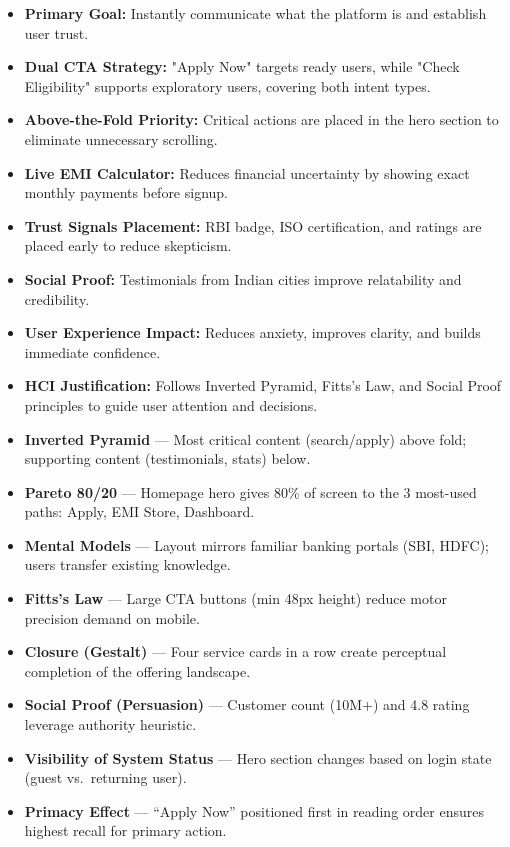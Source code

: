 \documentclass[11pt,a4paper]{article}
\newcommand{\ptag}[1]{\colorbox{tagbg}{\textcolor{tagtxt}{\textbf{\small #1}}}}
\begin{document}
\begin{itemize}[leftmargin=1.5em,itemsep=4pt]

\item \textbf{Primary Goal:}
Instantly communicate what the platform is and establish user trust.

\item \textbf{Dual CTA Strategy:}
"Apply Now" targets ready users, while "Check Eligibility" supports exploratory users, covering both intent types.

\item \textbf{Above-the-Fold Priority:}
Critical actions are placed in the hero section to eliminate unnecessary scrolling.

\item \textbf{Live EMI Calculator:}
Reduces financial uncertainty by showing exact monthly payments before signup.

\item \textbf{Trust Signals Placement:}
RBI badge, ISO certification, and ratings are placed early to reduce skepticism.

\item \textbf{Social Proof:}
Testimonials from Indian cities improve relatability and credibility.

\item \textbf{User Experience Impact:}
Reduces anxiety, improves clarity, and builds immediate confidence.

\item \textbf{HCI Justification:}
Follows Inverted Pyramid, Fitts’s Law, and Social Proof principles to guide user attention and decisions.

\end{itemize}
\begin{hcimap}
\begin{itemize}[leftmargin=1.2em,itemsep=2pt]
  \item \ptag{Inverted Pyramid} --- Most critical content (search/apply) above fold; supporting content (testimonials, stats) below.
  \item \ptag{Pareto 80/20} --- Homepage hero gives 80\% of screen to the 3 most-used paths: Apply, EMI Store, Dashboard.
  \item \ptag{Mental Models} --- Layout mirrors familiar banking portals (SBI, HDFC); users transfer existing knowledge.
  \item \ptag{Fitts's Law} --- Large CTA buttons (min 48px height) reduce motor precision demand on mobile.
  \item \ptag{Closure (Gestalt)} --- Four service cards in a row create perceptual completion of the offering landscape.
  \item \ptag{Social Proof (Persuasion)} --- Customer count (10M+) and 4.8 rating leverage authority heuristic.
  \item \ptag{Visibility of System Status} --- Hero section changes based on login state (guest vs.\ returning user).
  \item \ptag{Primacy Effect} --- ``Apply Now'' positioned first in reading order ensures highest recall for primary action.
\end{itemize}
\end{hcimap}
\end{document}
